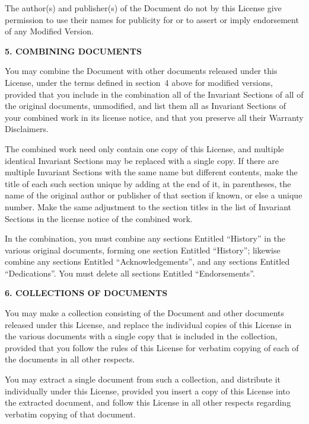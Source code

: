 The author(s) and publisher(s) of the Document do not by this License
give permission to use their names for publicity for or to assert or
imply endorsement of any Modified Version.


\begin{center}
{\Large\bf 5. COMBINING DOCUMENTS\par}
{}
\end{center}


You may combine the Document with other documents released under this
License, under the terms defined in section~4 above for modified
versions, provided that you include in the combination all of the
Invariant Sections of all of the original documents, unmodified, and
list them all as Invariant Sections of your combined work in its
license notice, and that you preserve all their Warranty Disclaimers.

The combined work need only contain one copy of this License, and
multiple identical Invariant Sections may be replaced with a single
copy.  If there are multiple Invariant Sections with the same name but
different contents, make the title of each such section unique by
adding at the end of it, in parentheses, the name of the original
author or publisher of that section if known, or else a unique number.
Make the same adjustment to the section titles in the list of
Invariant Sections in the license notice of the combined work.

In the combination, you must combine any sections Entitled ``History''
in the various original documents, forming one section Entitled
``History''; likewise combine any sections Entitled ``Acknowledgements'',
and any sections Entitled ``Dedications''.  You must delete all sections
Entitled ``Endorsements''.

\begin{center}
{\Large\bf 6. COLLECTIONS OF DOCUMENTS\par}
{}
\end{center}

You may make a collection consisting of the Document and other documents
released under this License, and replace the individual copies of this
License in the various documents with a single copy that is included in
the collection, provided that you follow the rules of this License for
verbatim copying of each of the documents in all other respects.

You may extract a single document from such a collection, and distribute
it individually under this License, provided you insert a copy of this
License into the extracted document, and follow this License in all
other respects regarding verbatim copying of that document.


